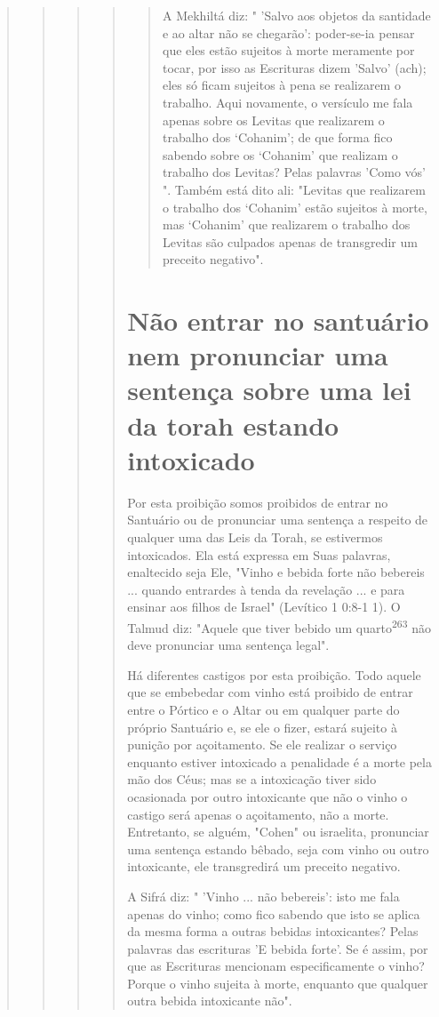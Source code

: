 \begin{quote}
\begin{quote}
\begin{quote}
\begin{quote}
\begin{quote}
A Mekhiltá diz: " 'Salvo aos objetos da santidade e ao altar não se
che­garão': poder-se-ia pensar que eles estão sujeitos à morte meramente
por tocar, por isso as Escrituras dizem 'Salvo' (ach); eles só ficam
sujeitos à pena se realiza­rem o trabalho. Aqui novamente, o versículo
me fala apenas sobre os Levitas que realizarem o trabalho dos `Cohanim';
de que forma fico sabendo sobre os
`Cohanim' que realizam o trabalho dos Levitas? Pelas palavras 'Como vós'
". Também está dito ali: "Levitas que realizarem o trabalho dos
`Cohanim' estão sujeitos à morte, mas `Cohanim' que realizarem o
trabalho dos Levitas são cul­pados apenas de transgredir um preceito
negativo".
\end{quote}

\section{Não entrar no santuário nem pronunciar uma 
sentença sobre uma lei da torah estando intoxicado}

Por esta proibição somos proibidos de entrar no Santuário ou de
pro­nunciar uma sentença a respeito de qualquer uma das Leis da Torah,
se estiver­mos intoxicados. Ela está expressa em Suas palavras,
enaltecido seja Ele, "Vi­nho e bebida forte não bebereis ... quando
entrardes à tenda da revelação ... e para ensinar aos filhos de Israel"
(Levítico 1 0:8-1 1). O Talmud diz: "Aquele que tiver bebido um
quarto\textsuperscript{263} não deve pronunciar uma sentença legal".

Há diferentes castigos por esta proibição. Todo aquele que se embe­bedar
com vinho está proibido de entrar entre o Pórtico e o Altar ou em
qual­quer parte do próprio Santuário e, se ele o fizer, estará sujeito à
punição por açoitamento. Se ele realizar o serviço enquanto estiver
intoxicado a penalidade é a morte pela mão dos Céus; mas se a
intoxicação tiver sido ocasionada por outro intoxicante que não o vinho
o castigo será apenas o açoitamento, não a morte. Entretanto, se alguém,
"Cohen" ou israelita, pronunciar uma senten­ça estando bêbado, seja com
vinho ou outro intoxicante, ele transgredirá um preceito negativo.

A Sifrá diz: " 'Vinho ... não bebereis': isto me fala apenas do vinho;
como fico sabendo que isto se aplica da mesma forma a outras bebidas
intoxi­cantes? Pelas palavras das escrituras 'E bebida forte'. Se é
assim, por que as Es­crituras mencionam especificamente o vinho? Porque
o vinho sujeita à morte, enquanto que qualquer outra bebida intoxicante
não".


\end{quote}
\end{quote}
\end{quote}
\end{quote}
